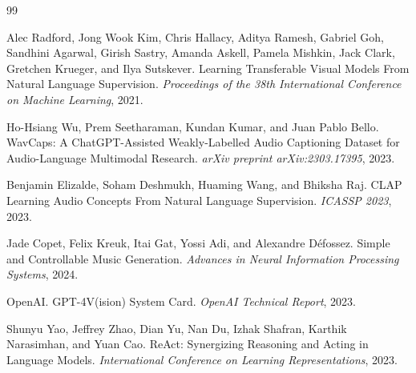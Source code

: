 \documentclass[12pt]{article}
\begin{document}
\begin{thebibliography}{99}

Alec Radford, Jong Wook Kim, Chris Hallacy, Aditya Ramesh, Gabriel Goh, Sandhini Agarwal, Girish Sastry, Amanda Askell, Pamela Mishkin, Jack Clark, Gretchen Krueger, and Ilya Sutskever.
Learning Transferable Visual Models From Natural Language Supervision.
\textit{Proceedings of the 38th International Conference on Machine Learning}, 2021.

Ho-Hsiang Wu, Prem Seetharaman, Kundan Kumar, and Juan Pablo Bello.
WavCaps: A ChatGPT-Assisted Weakly-Labelled Audio Captioning Dataset for Audio-Language Multimodal Research.
\textit{arXiv preprint arXiv:2303.17395}, 2023.

Benjamin Elizalde, Soham Deshmukh, Huaming Wang, and Bhiksha Raj.
CLAP Learning Audio Concepts From Natural Language Supervision.
\textit{ICASSP 2023}, 2023.

Jade Copet, Felix Kreuk, Itai Gat, Yossi Adi, and Alexandre Défossez.
Simple and Controllable Music Generation.
\textit{Advances in Neural Information Processing Systems}, 2024.

OpenAI.
GPT-4V(ision) System Card.
\textit{OpenAI Technical Report}, 2023.

Shunyu Yao, Jeffrey Zhao, Dian Yu, Nan Du, Izhak Shafran, Karthik Narasimhan, and Yuan Cao.
ReAct: Synergizing Reasoning and Acting in Language Models.
\textit{International Conference on Learning Representations}, 2023.

\end{thebibliography}
\end{document}
